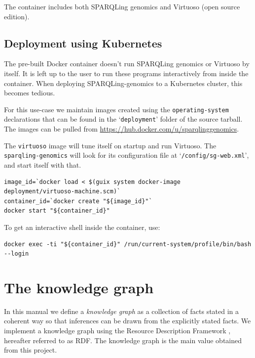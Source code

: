   The container includes both SPARQLing genomics and Virtuoso (open source
  edition).

\section{Deployment using Kubernetes}

  The pre-built Docker container doesn't run SPARQLing genomics or Virtuoso
  by itself.  It is left up to the user to run these programs interactively
  from inside the container.  When deploying SPARQLing-genomics to a Kubernetes
  cluster, this becomes tedious.

  \begin{sloppypar}
  For this use-case we maintain images created using the \texttt{operating-system}
  declarations that can be found in the `\texttt{deployment}' folder of the
  source tarball.  The images can be pulled from
  \href{https://hub.docker.com/u/sparqlinggenomics}
       {https://hub.docker.com/u/sparqlinggenomics}.
  \end{sloppypar}

  The \texttt{virtuoso} image will tune itself on startup and
  run Virtuoso.  The \texttt{sparqling-genomics} will look for its
  configuration file at `\texttt{/config/sg-web.xml}', and start itself with
  that.

\begin{siderules}
\begin{verbatim}
image_id=`docker load < $(guix system docker-image deployment/virtuoso-machine.scm)`
container_id=`docker create "${image_id}"`
docker start "${container_id}"
\end{verbatim}
\end{siderules}

To get an interactive shell inside the container, use:
\begin{siderules}
\begin{verbatim}
docker exec -ti "${container_id}" /run/current-system/profile/bin/bash --login
\end{verbatim}
\end{siderules}

\chapter{The knowledge graph}

  In this manual we define a \emph{knowledge graph} as a collection of
  facts stated in a coherent way so that inferences can be drawn from
  the explicitly stated facts.  We implement a knowledge graph using the
  Resource Description Framework \citep{Lassila:99:RDF}, hereafter referred
  to as RDF.  The knowledge graph is the main value obtained from this
  project.

